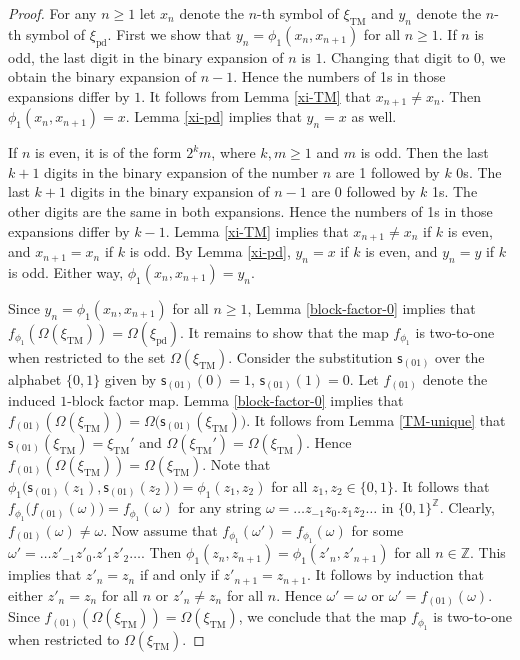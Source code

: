 \documentclass[12pt]{article}
\theoremstyle{definition}
\def\bZ{\mathbb{Z}}
\def\om{\omega}
\def\Om{\Omega}
\def\xiTM{\xi_{\mathrm{TM}}}
\def\xipd{\xi_{\mathrm{pd}}}
\begin{document}
\begin{proof}
For any $n\ge1$ let $x_n$ denote the $n$-th symbol of $\xiTM$ and $y_n$ 
denote the $n$-th symbol of $\xipd$.  First we show that 
$y_n=\phi_1(x_n,x_{n+1})$ for all $n\ge1$.  If $n$ is odd, the last digit 
in the binary expansion of $n$ is $1$.  Changing that digit to $0$, we 
obtain the binary expansion of $n-1$.  Hence the numbers of 1s in those 
expansions differ by $1$.  It follows from Lemma \ref{xi-TM} that 
$x_{n+1}\ne x_n$.  Then $\phi_1(x_n,x_{n+1})=x$.  Lemma \ref{xi-pd} implies 
that $y_n=x$ as well.

If $n$ is even, it is of the form $2^km$, where $k,m\ge1$ and $m$ is odd.  
Then the last $k+1$ digits in the binary expansion of the number $n$ are 1 
followed by $k$ 0s.  The last $k+1$ digits in the binary expansion of $n-1$ 
are 0 followed by $k$ 1s.  The other digits are the same in both 
expansions.  Hence the numbers of 1s in those expansions differ by $k-1$.  
Lemma \ref{xi-TM} implies that $x_{n+1}\ne x_n$ if $k$ is even, and 
$x_{n+1}=x_n$ if $k$ is odd.  By Lemma \ref{xi-pd}, $y_n=x$ if $k$ is even, 
and $y_n=y$ if $k$ is odd.  Either way, $\phi_1(x_n,x_{n+1})=y_n$.

Since $y_n=\phi_1(x_n,x_{n+1})$ for all $n\ge1$, Lemma \ref{block-factor-0} 
implies that $f_{\phi_1}(\Om(\xiTM))=\Om(\xipd)$.  It remains to show that 
the map $f_{\phi_1}$ is two-to-one when restricted to the set 
$\Om(\xiTM)$.  Consider the substitution $\mathsf{s}_{(01)}$ over the 
alphabet $\{0,1\}$ given by $\mathsf{s}_{(01)}(0)=1$, 
$\mathsf{s}_{(01)}(1)=0$.  Let $f_{(01)}$ denote the induced $1$-block 
factor map.  Lemma \ref{block-factor-0} implies that 
$f_{(01)}(\Om(\xiTM))=\Om\bigl(\mathsf{s}_{(01)}(\xiTM)\bigr)$.  It follows 
from Lemma \ref{TM-unique} that $\mathsf{s}_{(01)}(\xiTM)=\xiTM'$ and 
$\Om(\xiTM')=\Om(\xiTM)$.  Hence $f_{(01)}(\Om(\xiTM))=\Om(\xiTM)$.  Note 
that $\phi_1\bigl(\mathsf{s}_{(01)}(z_1),\mathsf{s}_{(01)}(z_2)\bigr)=
\phi_1(z_1,z_2)$ for all $z_1,z_2\in\{0,1\}$.  It follows that 
$f_{\phi_1}\bigl(f_{(01)}(\om)\bigr)=f_{\phi_1}(\om)$ for any string 
$\om=\ldots z_{-1}z_0.z_1z_2\ldots$ in $\{0,1\}^{\bZ}$.  Clearly, 
$f_{(01)}(\om)\ne\om$.  Now assume that $f_{\phi_1}(\om')=f_{\phi_1}(\om)$ 
for some $\om'=\ldots z'_{-1}z'_0.z'_1z'_2\ldots$.  Then 
$\phi_1(z_n,z_{n+1})=\phi_1(z'_n,z'_{n+1})$ for all $n\in\bZ$.  This 
implies that $z'_n=z_n$ if and only if $z'_{n+1}=z_{n+1}$.  It follows by 
induction that either $z'_n=z_n$ for all $n$ or $z'_n\ne z_n$ for all $n$.  
Hence $\om'=\om$ or $\om'=f_{(01)}(\om)$.  Since 
$f_{(01)}(\Om(\xiTM))=\Om(\xiTM)$, we conclude that the map $f_{\phi_1}$ is 
two-to-one when restricted to $\Om(\xiTM)$.
\end{proof}
\end{document}
